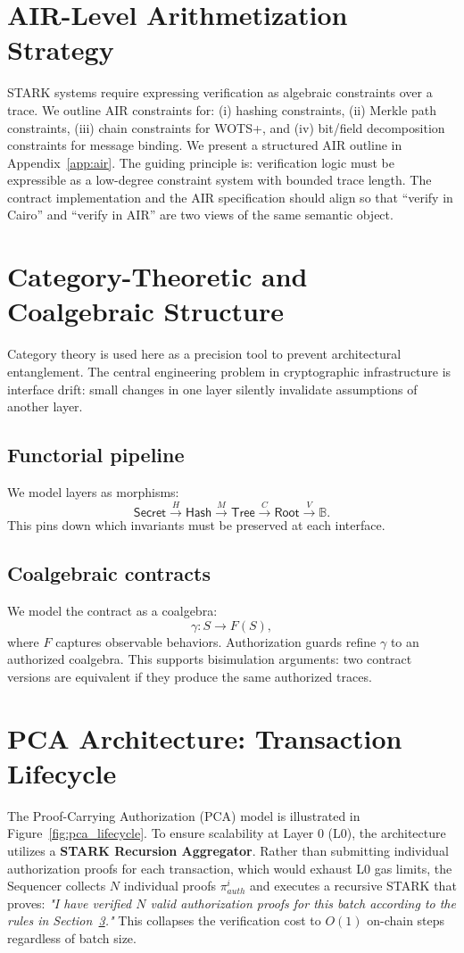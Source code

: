 \documentclass[conference]{IEEEtran}
\theoremstyle{definition}
\theoremstyle{plain}
\theoremstyle{remark}
\newcommand{\B}{\mathbb{B}}
\begin{document}
\section{AIR-Level Arithmetization Strategy}
STARK systems require expressing verification as algebraic constraints over a trace. We outline AIR constraints for: (i) hashing constraints, (ii) Merkle path constraints, (iii) chain constraints for WOTS+, and (iv) bit/field decomposition constraints for message binding. We present a structured AIR outline in Appendix~\ref{app:air}. The guiding principle is: verification logic must be expressible as a low-degree constraint system with bounded trace length. The contract implementation and the AIR specification should align so that ``verify in Cairo'' and ``verify in AIR'' are two views of the same semantic object.

\section{Category-Theoretic and Coalgebraic Structure}
Category theory is used here as a precision tool to prevent architectural entanglement. The central engineering problem in cryptographic infrastructure is interface drift: small changes in one layer silently invalidate assumptions of another layer.

\subsection{Functorial pipeline}
We model layers as morphisms:
\[
\mathsf{Secret}\xrightarrow{H}\mathsf{Hash}\xrightarrow{M}\mathsf{Tree}\xrightarrow{C}\mathsf{Root}\xrightarrow{V}\B.
\]
This pins down which invariants must be preserved at each interface.

\subsection{Coalgebraic contracts}
We model the contract as a coalgebra:
\[
\gamma:S\to F(S),
\]
where $F$ captures observable behaviors. Authorization guards refine $\gamma$ to an authorized coalgebra. This supports bisimulation arguments: two contract versions are equivalent if they produce the same authorized traces.
\section{PCA Architecture: Transaction Lifecycle}
\label{sec:pca}
The Proof-Carrying Authorization (PCA) model is illustrated in Figure~\ref{fig:pca_lifecycle}. To ensure scalability at Layer 0 (L0), the architecture utilizes a \textbf{STARK Recursion Aggregator}. Rather than submitting individual authorization proofs for each transaction, which would exhaust L0 gas limits, the Sequencer collects $N$ individual proofs $\pi_{auth}^i$ and executes a recursive STARK that proves: \textit{"I have verified $N$ valid authorization proofs for this batch according to the rules in Section~\ref{sec:pca}."} This collapses the verification cost to $O(1)$ on-chain steps regardless of batch size.
\end{document}
